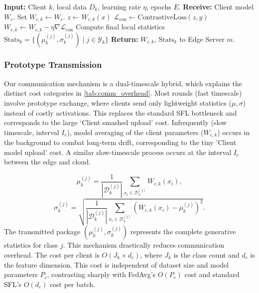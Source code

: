    \begin{algorithm}[!h]
        \caption{H-SFP: Client-Side Training}
        \label{alg:client}
        \begin{algorithmic}[1]
        \State \textbf{Input:} Client $k$, local data $D_k$, learning rate $\eta$, epochs $E$.
        \State \textbf{Receive:} Client model $W_c$.
        \State Set $W_{c,k} \leftarrow W_c$.
                \State $z \leftarrow W_{c,k}(x)$ 
                \State $\mathcal{L}_{\text{con}} \leftarrow \text{ContrastiveLoss}(z, y)$ 
                \State $W_{c,k} \leftarrow W_{c,k} - \eta \nabla \mathcal{L}_{\text{con}}$
            \EndFor
        \EndFor
        \State Compute final local statistics $\text{Stats}_k = \{(\mu_k^{(j)}, \sigma_k^{(j)}) \mid j \in \mathcal{Y}_k\}$
        \State \textbf{Return:} $W_{c,k}$, $\text{Stats}_k$ to Edge Server $m$.
        \end{algorithmic}
    \end{algorithm}
    
    \subsubsection{Prototype Transmission}
        Our communication mechanism is a dual-timescale hybrid, which explains the distinct cost categories in \cref{tab:comm_overhead}. Most rounds (fast timescale) involve prototype exchange, where clients send only lightweight statistics ($\mu, \sigma$) instead of costly activations. This replaces the standard SFL bottleneck and corresponds to the large `Client smashed upload' cost. Infrequently (slow timescale, interval $I_c$), model averaging of the client parameters ($W_{c,k}$) occurs in the background to combat long-term drift, corresponding to the tiny 'Client model upload' cost. A similar slow-timescale process occurs at the interval $I_e$ between the edge and cloud.

        \begin{equation}
            \mu_k^{(j)} = \frac{1}{|\mathcal{D}_k^{(j)}|} \sum_{x_i \in \mathcal{D}_k^{(j)}} W_{c,k}(x_i),
            \label{mean_client}
        \end{equation}
        \begin{equation}
            \sigma_k^{(j)} = \sqrt{\frac{1}{|\mathcal{D}_k^{(j)}|} \sum_{x_i \in \mathcal{D}_k^{(j)}} (W_{c,k}(x_i) - \mu_k^{(j)})^2}.
            \label{std_client}
        \end{equation}
        The transmitted package $(\mu_k^{(j)}, \sigma_k^{(j)})$ represents the complete generative statistics for class $j$. This mechanism drastically reduces communication overhead. The cost per client is $O(J_k \times d_c)$, where $J_k$ is the class count and $d_c$ is the feature dimension. This cost is independent of dataset size and model parameters $P_c$, contrasting sharply with FedAvg's $O(P_c)$ cost and standard SFL's $O(d_c)$ cost per batch.


